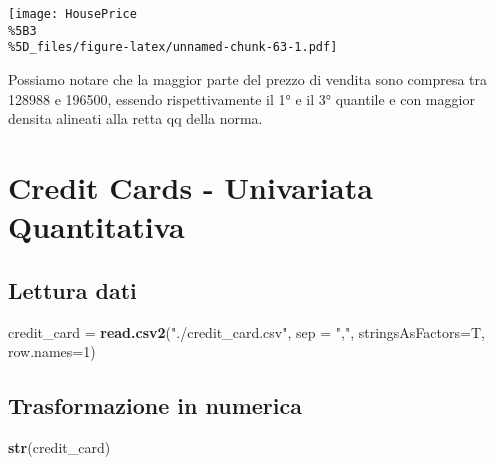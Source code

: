 \documentclass[
]{article}
\newenvironment{Shaded}{\begin{snugshade}}{\end{snugshade}}
\newcommand{\AttributeTok}[1]{\textcolor[rgb]{0.13,0.29,0.53}{#1}}
\newcommand{\DecValTok}[1]{\textcolor[rgb]{0.00,0.00,0.81}{#1}}
\newcommand{\FunctionTok}[1]{\textcolor[rgb]{0.13,0.29,0.53}{\textbf{#1}}}
\newcommand{\NormalTok}[1]{#1}
\newcommand{\OtherTok}[1]{\textcolor[rgb]{0.56,0.35,0.01}{#1}}
\newcommand{\StringTok}[1]{\textcolor[rgb]{0.31,0.60,0.02}{#1}}
\begin{document}
\texttt{[image: HousePrice\\\%5B3\\\%5D\_files/figure-latex/unnamed-chunk-63-1.pdf]}

Possiamo notare che la maggior parte del prezzo di vendita sono compresa
tra 128988 e 196500, essendo rispettivamente il 1° e il 3° quantile e
con maggior densita alineati alla retta qq della norma.

\section{Credit Cards - Univariata
Quantitativa}\label{credit-cards---univariata-quantitativa}

\subsection{Lettura dati}\label{lettura-dati-1}

\begin{Shaded}
\begin{Highlighting}[]
\NormalTok{credit\_card }\OtherTok{=} \FunctionTok{read.csv2}\NormalTok{(}\StringTok{"./credit\_card.csv"}\NormalTok{, }\AttributeTok{sep =} \StringTok{","}\NormalTok{, }\AttributeTok{stringsAsFactors=}\NormalTok{T, }\AttributeTok{row.names=}\DecValTok{1}\NormalTok{)}
\end{Highlighting}
\end{Shaded}

\subsection{Trasformazione in
numerica}\label{trasformazione-in-numerica}

\begin{Shaded}
\begin{Highlighting}[]
\FunctionTok{str}\NormalTok{(credit\_card)}
\end{Highlighting}
\end{Shaded}
\end{document}
